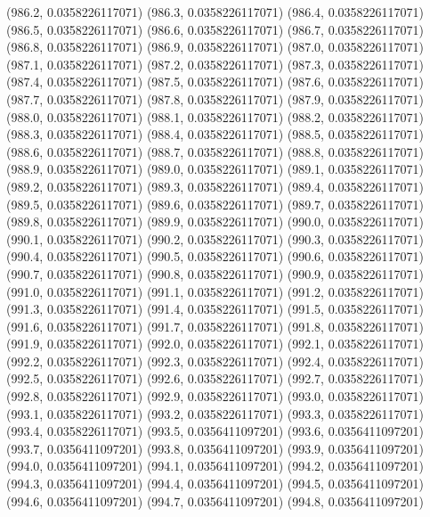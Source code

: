 {					(986.2, 0.0358226117071)
					(986.3, 0.0358226117071)
					(986.4, 0.0358226117071)
					(986.5, 0.0358226117071)
					(986.6, 0.0358226117071)
					(986.7, 0.0358226117071)
					(986.8, 0.0358226117071)
					(986.9, 0.0358226117071)
					(987.0, 0.0358226117071)
					(987.1, 0.0358226117071)
					(987.2, 0.0358226117071)
					(987.3, 0.0358226117071)
					(987.4, 0.0358226117071)
					(987.5, 0.0358226117071)
					(987.6, 0.0358226117071)
					(987.7, 0.0358226117071)
					(987.8, 0.0358226117071)
					(987.9, 0.0358226117071)
					(988.0, 0.0358226117071)
					(988.1, 0.0358226117071)
					(988.2, 0.0358226117071)
					(988.3, 0.0358226117071)
					(988.4, 0.0358226117071)
					(988.5, 0.0358226117071)
					(988.6, 0.0358226117071)
					(988.7, 0.0358226117071)
					(988.8, 0.0358226117071)
					(988.9, 0.0358226117071)
					(989.0, 0.0358226117071)
					(989.1, 0.0358226117071)
					(989.2, 0.0358226117071)
					(989.3, 0.0358226117071)
					(989.4, 0.0358226117071)
					(989.5, 0.0358226117071)
					(989.6, 0.0358226117071)
					(989.7, 0.0358226117071)
					(989.8, 0.0358226117071)
					(989.9, 0.0358226117071)
					(990.0, 0.0358226117071)
					(990.1, 0.0358226117071)
					(990.2, 0.0358226117071)
					(990.3, 0.0358226117071)
					(990.4, 0.0358226117071)
					(990.5, 0.0358226117071)
					(990.6, 0.0358226117071)
					(990.7, 0.0358226117071)
					(990.8, 0.0358226117071)
					(990.9, 0.0358226117071)
					(991.0, 0.0358226117071)
					(991.1, 0.0358226117071)
					(991.2, 0.0358226117071)
					(991.3, 0.0358226117071)
					(991.4, 0.0358226117071)
					(991.5, 0.0358226117071)
					(991.6, 0.0358226117071)
					(991.7, 0.0358226117071)
					(991.8, 0.0358226117071)
					(991.9, 0.0358226117071)
					(992.0, 0.0358226117071)
					(992.1, 0.0358226117071)
					(992.2, 0.0358226117071)
					(992.3, 0.0358226117071)
					(992.4, 0.0358226117071)
					(992.5, 0.0358226117071)
					(992.6, 0.0358226117071)
					(992.7, 0.0358226117071)
					(992.8, 0.0358226117071)
					(992.9, 0.0358226117071)
					(993.0, 0.0358226117071)
					(993.1, 0.0358226117071)
					(993.2, 0.0358226117071)
					(993.3, 0.0358226117071)
					(993.4, 0.0358226117071)
					(993.5, 0.0356411097201)
					(993.6, 0.0356411097201)
					(993.7, 0.0356411097201)
					(993.8, 0.0356411097201)
					(993.9, 0.0356411097201)
					(994.0, 0.0356411097201)
					(994.1, 0.0356411097201)
					(994.2, 0.0356411097201)
					(994.3, 0.0356411097201)
					(994.4, 0.0356411097201)
					(994.5, 0.0356411097201)
					(994.6, 0.0356411097201)
					(994.7, 0.0356411097201)
					(994.8, 0.0356411097201)
}

